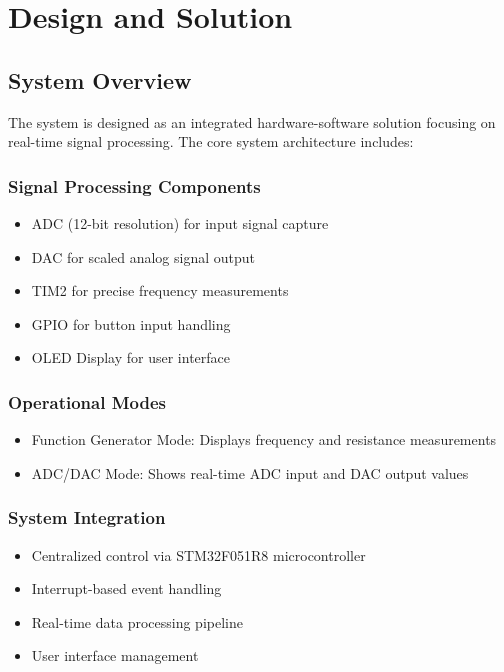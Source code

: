 \section{Design and Solution}

\subsection{System Overview}
The system is designed as an integrated hardware-software solution focusing on real-time signal processing. The core system architecture includes:

\subsubsection{Signal Processing Components}
\begin{itemize}
    \item ADC (12-bit resolution) for input signal capture
    \item DAC for scaled analog signal output
    \item TIM2 for precise frequency measurements
    \item GPIO for button input handling
    \item OLED Display for user interface
\end{itemize}

\subsubsection{Operational Modes}
\begin{itemize}
    \item Function Generator Mode: Displays frequency and resistance measurements
    \item ADC/DAC Mode: Shows real-time ADC input and DAC output values
\end{itemize}

\subsubsection{System Integration}
\begin{itemize}
    \item Centralized control via STM32F051R8 microcontroller
    \item Interrupt-based event handling
    \item Real-time data processing pipeline
    \item User interface management
\end{itemize}

